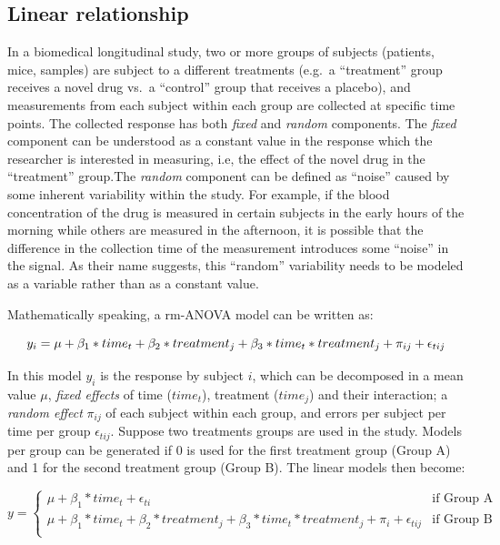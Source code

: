 \documentclass[
]{article}
\begin{document}
\hypertarget{linear-relationship}{%
\subsection{Linear relationship}\label{linear-relationship}}

In a biomedical longitudinal study, two or more groups of subjects (patients, mice, samples) are subject to a different treatments (e.g.~a ``treatment'' group receives a novel drug vs.~a ``control'' group that receives a placebo), and measurements from each subject within each group are collected at specific time points. The collected response has both \emph{fixed} and \emph{random} components. The \emph{fixed} component can be understood as a constant value in the response which the researcher is interested in measuring, i.e, the effect of the novel drug in the ``treatment'' group.The \emph{random} component can be defined as ``noise'' caused by some inherent variability within the study. For example, if the blood concentration of the drug is measured in certain subjects in the early hours of the morning while others are measured in the afternoon, it is possible that the difference in the collection time of the measurement introduces some ``noise'' in the signal. As their name suggests, this ``random'' variability needs to be modeled as a variable rather than as a constant value.

Mathematically speaking, a rm-ANOVA model can be written as:

\begin{equation}
y_{i} = \mu+ \beta_1* time_{t} + \beta_2* treatment_{j} + \beta_3* time_{t}*treatment_{j}+\pi_{ij} +\epsilon_{tij}\\ 
\label{eq:linear-model}
\end{equation}

In this model \(y_i\) is the response by subject \(i\), which can be decomposed in a mean value \(\mu\), \emph{fixed effects} of time (\(time_t\)), treatment (\(time_j\)) and their interaction; a \emph{random effect} \(\pi_{ij}\) of each subject within each group, and errors per subject per time per group \(\epsilon_{tij}\).
Suppose two treatments groups are used in the study. Models per group can be generated if 0 is used for the first treatment group (Group A) and 1 for the second treatment group (Group B). The linear models then become:

\begin{equation}
y = \begin{cases}
\mu + \beta_1*time_{t}+\epsilon_{ti}   & \mbox{if Group A}\\
\mu + \beta_1 * time_{t} + \beta_2 * treatment_{j} +\beta_3* time_{t} * treatment_{j}+\pi_{i}+\epsilon_{tij}  & \mbox{if Group B}\\
\end{cases}
\label{eq:ANOVA-by-group}
\end{equation}
\end{document}
